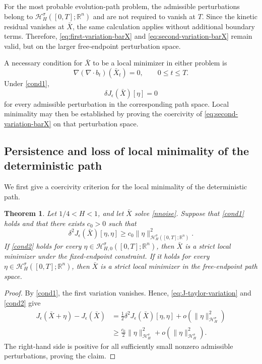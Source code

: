 \documentclass[preprint,12pt]{elsarticle}
\newtheorem{theorem}{Theorem}[section]
\theoremstyle{definition}
\theoremstyle{plain}
\begin{document}
For the most probable evolution-path problem, the admissible
perturbations belong to
$\mathcal H_H^\sigma([0,T];\mathbb R^n)$ and are not required to
vanish at $T$. Since the kinetic residual vanishes at $\bar X$, the
same calculation applies without additional boundary terms.
Therefore, \eqref{eq:first-variation-barX} and
\eqref{eq:second-variation-barX} remain valid, but on the larger
free-endpoint perturbation space.

A necessary condition for $\bar X$ to be a local minimizer in either
problem is
\begin{equation}
\label{cond1}
    \nabla(\nabla\!\cdot b_t)(\bar X_t)=0,
    \qquad
    0\leq t\leq T.
\end{equation}
Under \eqref{cond1},
\begin{equation}
\label{first-variation}
    \delta J_\epsilon(\bar X)[\eta]=0
\end{equation}
for every admissible perturbation in the corresponding path space.
Local minimality may then be established by proving the coercivity of
\eqref{eq:second-variation-barX} on that perturbation space.


\subsection{Persistence and loss of local minimality of the deterministic path}

We first give a coercivity criterion for the local minimality of the
deterministic path.

\begin{theorem}
\label{variation}
Let $1/4<H<1$, and let $\bar X$ solve \eqref{nnoise}. Suppose that
\eqref{cond1} holds and that there exists $c_0>0$ such that
\begin{equation}
\label{cond2}
    \delta^2J_\epsilon(\bar X)[\eta,\eta]
    \geq
    c_0
    \|\eta\|_{\mathcal H_H^\sigma([0,T];\mathbb R^n)}^2.
\end{equation}
If \eqref{cond2} holds for every
$\eta\in\mathcal H_{H,0}^\sigma([0,T];\mathbb R^n)$, then $\bar X$ is
a strict local minimizer under the fixed-endpoint constraint. If it
holds for every
$\eta\in\mathcal H_H^\sigma([0,T];\mathbb R^n)$, then $\bar X$ is a
strict local minimizer in the free-endpoint path space.
\end{theorem}

\begin{proof}
By \eqref{cond1}, the first variation vanishes. Hence,
\eqref{eq:J-taylor-variation} and \eqref{cond2} give
\begin{equation*}
\begin{aligned}
    J_\epsilon(\bar X+\eta)-J_\epsilon(\bar X)
    &=
    \frac12\delta^2J_\epsilon(\bar X)[\eta,\eta]
    +
    o\left(
        \|\eta\|_{\mathcal H_H^\sigma}^2
    \right)
    \\
    &\geq
    \frac{c_0}{2}
    \|\eta\|_{\mathcal H_H^\sigma}^2
    +
    o\left(
        \|\eta\|_{\mathcal H_H^\sigma}^2
    \right).
\end{aligned}
\end{equation*}
The right-hand side is positive for all sufficiently small nonzero
admissible perturbations, proving the claim.
\end{proof}
\end{document}
